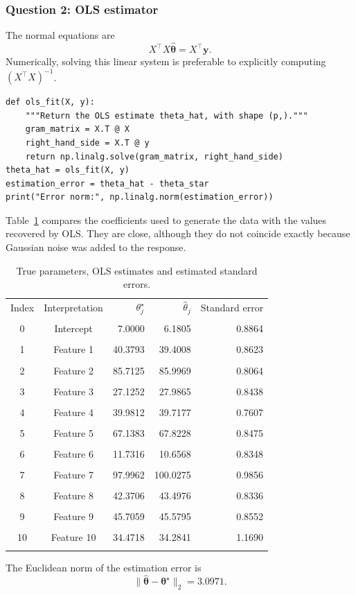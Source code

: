 \documentclass[11pt,a4paper]{article}
\newcommand{\thetahat}{\widehat{\bm\theta}}
\begin{document}
\subsubsection{Question 2: OLS estimator}
The normal equations are
\[
    X^\top X\thetahat=X^\top\bm y.
\]
Numerically, solving this linear system is preferable to explicitly computing
$(X^\top X)^{-1}$.
\begin{lstlisting}[caption={OLS implementation based on the normal equations.}]
def ols_fit(X, y):
    """Return the OLS estimate theta_hat, with shape (p,)."""
    gram_matrix = X.T @ X
    right_hand_side = X.T @ y
    return np.linalg.solve(gram_matrix, right_hand_side)
theta_hat = ols_fit(X, y)
estimation_error = theta_hat - theta_star
print("Error norm:", np.linalg.norm(estimation_error))
\end{lstlisting}
Table~\ref{tab:coefficients} compares the coefficients used to generate the
data with the values recovered by OLS. They are close, although they do not
coincide exactly because Gaussian noise was added to the response.
\begin{table}[H]
    \centering
    \caption{True parameters, OLS estimates and estimated standard errors.}
    \label{tab:coefficients}
    \small
    \renewcommand{\arraystretch}{1.08}
    \begin{tabular}{ccrrr}
        \toprule
        Index & Interpretation & $\theta_j^\star$ & $\widehat\theta_j$ & Standard error \\\\
        \midrule
        0  & Intercept & 7.0000  & 6.1805   & 0.8864 \\\\
        1  & Feature 1 & 40.3793 & 39.4008  & 0.8623 \\\\
        2  & Feature 2 & 85.7125 & 85.9969  & 0.8064 \\\\
        3  & Feature 3 & 27.1252 & 27.9865  & 0.8438 \\\\
        4  & Feature 4 & 39.9812 & 39.7177  & 0.7607 \\\\
        5  & Feature 5 & 67.1383 & 67.8228  & 0.8475 \\\\
        6  & Feature 6 & 11.7316 & 10.6568  & 0.8348 \\\\
        7  & Feature 7 & 97.9962 & 100.0275 & 0.9856 \\\\
        8  & Feature 8 & 42.3706 & 43.4976  & 0.8336 \\\\
        9  & Feature 9 & 45.7059 & 45.5795  & 0.8552 \\\\
        10 & Feature 10 & 34.4718 & 34.2841 & 1.1690 \\\\
        \bottomrule
    \end{tabular}
\end{table}
The Euclidean norm of the estimation error is
\[
    \|\thetahat-\bm\theta^\star\|_2=3.0971.
\]
\end{document}
